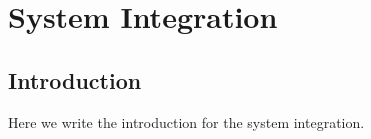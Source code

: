 \chapter{System Integration} \label{ch:4-system-integration}

\section{Introduction} \label{sec:4-system-integration-introduction}
Here we write the introduction for the system integration.


